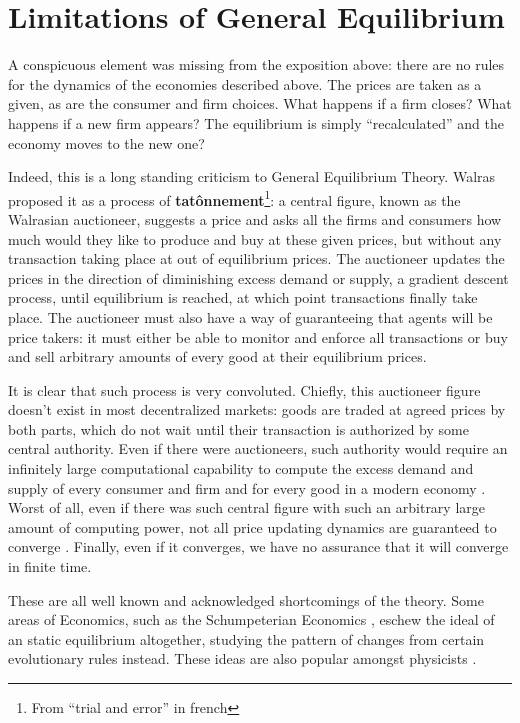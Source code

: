 \section{Limitations of General Equilibrium}

A conspicuous element was missing from the exposition above: there are no rules for the dynamics of the economies described above. The prices are taken as a given, as are the consumer and firm choices. What happens if a firm closes? What happens if a new firm appears? The equilibrium is simply ``recalculated'' and the economy moves to the new one?

Indeed, this is a long standing criticism to General Equilibrium Theory. Walras proposed it as a process of \textbf{tatônnement}\footnote{From ``trial and error'' in french}: a central figure, known as the Walrasian auctioneer, suggests a price and asks all the firms and consumers how much would they like to produce and buy at these given prices, but without any transaction taking place at out of equilibrium prices. The auctioneer updates the prices in the direction of diminishing excess demand or supply, a gradient descent process, until equilibrium is reached, at which point transactions finally take place. The auctioneer must also have a way of guaranteeing that agents will be price takers: it must either be able to monitor and enforce all transactions or buy and sell arbitrary amounts of every good at their equilibrium prices.

It is clear that such process is very convoluted. Chiefly, this auctioneer figure doesn't exist in most decentralized markets: goods are traded at agreed prices by both parts, which do not wait until their transaction is authorized by some central authority. Even if there were auctioneers, such authority would require an infinitely large computational capability to compute the excess demand and supply of every consumer and firm and for every good in a modern economy \cite{axtell05, Roughgarden10}. Worst of all, even if there was such central figure with such an arbitrary large amount of computing power, not all price updating dynamics are guaranteed to converge \cite{Gintis07}. Finally, even if it converges, we have no assurance that it will converge in finite time.

These are all well known and acknowledged shortcomings of the theory. Some areas of Economics, such as the Schumpeterian Economics \cite{Schumpeter39}, eschew the ideal of an static equilibrium altogether, studying the pattern of changes from certain evolutionary rules instead. These ideas are also popular amongst physicists \cite{thurner}.

